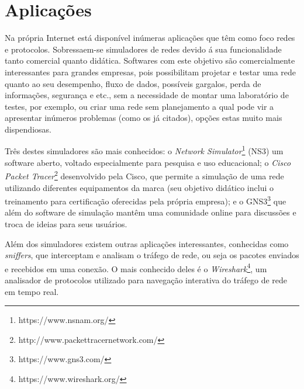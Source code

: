 \section{Aplicações}

Na própria Internet está disponível inúmeras aplicações que têm como foco redes e protocolos. Sobressaem-se simuladores de redes devido á sua funcionalidade tanto comercial quanto didática. Softwares com este objetivo são comercialmente interessantes para grandes empresas, pois possibilitam projetar e testar uma rede quanto ao seu desempenho, fluxo de dados, possíveis gargalos, perda de informações, segurança e etc., sem a necessidade de montar uma laboratório de testes, por exemplo, ou criar uma rede sem planejamento a qual pode vir a apresentar inúmeros problemas (como os já citados), opções estas muito mais dispendiosas.

Três destes simuladores são mais conhecidos: o \textit{Network Simulator}\footnote{https://www.nsnam.org/} (NS3) um software aberto, voltado especialmente para pesquisa e uso educacional; o \textit{Cisco Packet Tracer}\footnote{http://www.packettracernetwork.com/} desenvolvido pela Cisco\textregistered, que permite a simulação de uma rede utilizando diferentes equipamentos da marca (seu objetivo didático inclui o treinamento para certificação oferecidas pela própria empresa); e o GNS3\footnote{https://www.gns3.com/} que além do software de simulação mantêm uma comunidade online para discussões e troca de ideias para seus usuários. 

Além dos simuladores existem outras aplicações interessantes, conhecidas como \textit{sniffers}, que interceptam e analisam o tráfego de rede, ou seja os pacotes enviados e recebidos em uma conexão. O mais conhecido deles é o \textit{Wireshark}\footnote{https://www.wireshark.org/}, um analisador de protocolos utilizado para navegação interativa do tráfego de rede em tempo real.

